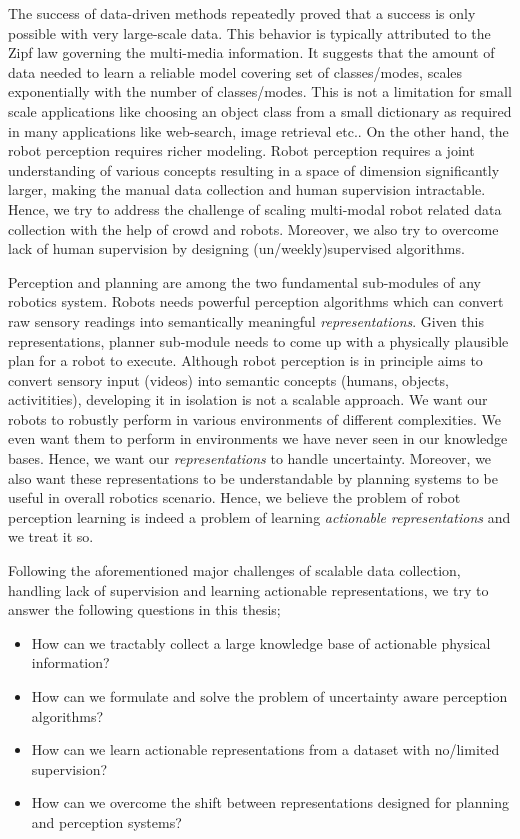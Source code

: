 The success of data-driven methods repeatedly proved that a success is only possible with very large-scale data. This behavior is typically attributed to the Zipf law governing the multi-media information. It suggests that the amount of data needed to learn a reliable model covering set of classes/modes, scales exponentially with the number of classes/modes. This is not a limitation for small scale applications like choosing an object class from a small dictionary as required in many applications like web-search, image retrieval etc.. On the other hand, the robot perception requires richer modeling. Robot perception requires a joint understanding of various concepts resulting in a space of dimension significantly larger, making the manual data collection and human supervision intractable. Hence, we try to address the challenge of scaling multi-modal robot related data collection with the help of crowd and robots. Moreover, we also try to overcome lack of human supervision by designing (un/weekly)supervised algorithms.

Perception and planning are among the two fundamental sub-modules of any robotics system. Robots needs powerful perception algorithms which can convert raw sensory readings into semantically meaningful \emph{representations}. Given this representations, planner sub-module needs to come up with a physically plausible plan for a robot to execute. Although robot perception is in principle aims to convert sensory input (\eg videos) into semantic concepts (\eg humans, objects, activitities), developing it in isolation is not a scalable approach. We want our robots to robustly perform in various environments of different complexities. We even want them to perform in environments we have never seen in our knowledge bases. Hence, we want our \emph{representations} to handle uncertainty. Moreover, we also want these representations to be understandable by planning systems to be useful in overall robotics scenario. Hence, we believe the problem of robot perception learning is indeed a problem of learning \emph{actionable representations} and we treat it so.

Following the aforementioned major challenges of scalable data collection, handling lack of supervision and learning actionable representations, we try to answer the following questions in this thesis;
\begin{itemize}
\item How can we tractably collect a large knowledge base of actionable physical information?
\item How can we formulate and solve the problem of uncertainty aware perception algorithms?
\item How can we learn actionable representations from a dataset with no/limited supervision?
\item How can we overcome the shift between representations designed for planning and perception systems? 
\end{itemize}

